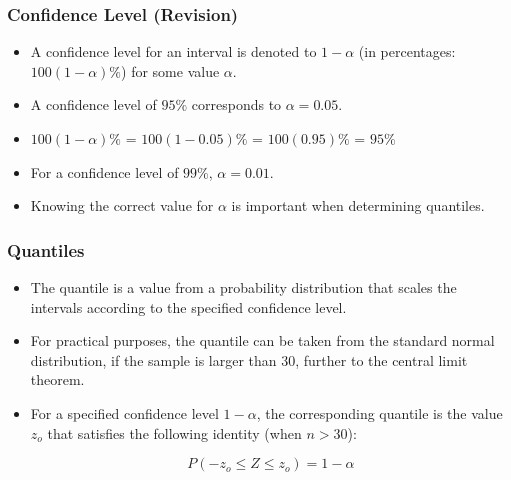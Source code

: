\begin{frame}
\frametitle{Confidence Level (Revision) }

\begin{itemize}
\item A confidence level for an interval is denoted to $1-\alpha$ (in percentages: $100(1-\alpha)\%$) for some value $\alpha$.
\item A confidence level of $95\%$ corresponds to $\alpha = 0.05$.
\item $100(1-\alpha)\%$ = $100(1-0.05)\%$  = $100(0.95)\%$ = $95\%$
\item For a confidence level of $99\%$, $\alpha = 0.01$.
\item Knowing the correct value for $\alpha$ is important when determining quantiles.
\end{itemize}

\end{frame}
\begin{frame}
\frametitle{Quantiles }

\begin{itemize}
\item The quantile is a value from a probability distribution that scales the intervals according to the specified confidence level.
\item For practical purposes, the quantile can be taken from the standard normal distribution, if the sample is larger than 30, further to the central limit theorem.
\item For a specified confidence level $1-\alpha $, the corresponding quantile is the value $z_o$ that satisfies the following identity (when $n > 30$):

    \[ P( -z_o \leq Z \leq z_o) = 1- \alpha \]

\end{itemize}

\end{frame}

